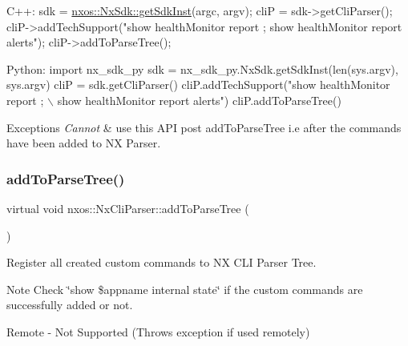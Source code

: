 \begin{DoxyCode}
C++:
     sdk = \mbox{\hyperlink{classnxos_1_1_nx_sdk_a5050e2d26c40744b4fc7862068a83f39}{nxos::NxSdk::getSdkInst}}(argc, argv);
     cliP = sdk->getCliParser();
     cliP->addTechSupport(\textcolor{stringliteral}{"show healthMonitor report ; show healthMonitor report alerts"});
     cliP->addToParseTree();

Python:
     \textcolor{keyword}{import} nx\_sdk\_py
     sdk = nx\_sdk\_py.NxSdk.getSdkInst(len(sys.argv), sys.argv)
     cliP = sdk.getCliParser()
     cliP.addTechSupport(\textcolor{stringliteral}{"show healthMonitor report ; \(\backslash\)}
\textcolor{stringliteral}{                          show healthMonitor report alerts"})
     cliP.addToParseTree()
\end{DoxyCode}



\begin{DoxyExceptions}{Exceptions}
{\em Cannot} & use this A\+PI post add\+To\+Parse\+Tree i.\+e after the commands have been added to NX Parser. \\
\hline
\end{DoxyExceptions}
\mbox{\label{classnxos_1_1_nx_cli_parser_a3c5295a4b2de3068d1653a6c303a22ee}} 
\subsubsection{\texorpdfstring{add\+To\+Parse\+Tree()}{addToParseTree()}}
{\footnotesize\ttfamily virtual void nxos\+::\+Nx\+Cli\+Parser\+::add\+To\+Parse\+Tree (\begin{DoxyParamCaption}{ }\end{DoxyParamCaption})\hspace{0.3cm}{\ttfamily [pure virtual]}}

Register all created custom commands to NX C\+LI Parser Tree.

\begin{DoxyNote}{Note}
Check \char`\"{}show \$appname internal state\char`\"{} if the custom commands are successfully added or not.
\end{DoxyNote}
\begin{DoxyVerb}Remote - Not Supported (Throws exception if used remotely)
\end{DoxyVerb}



